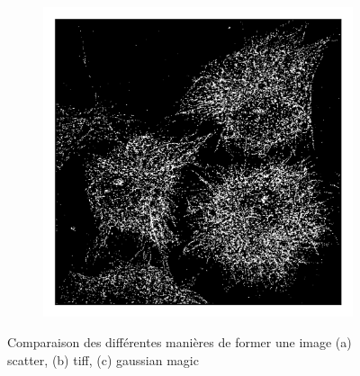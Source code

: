 \begin{figure}
\begin{subfigure}{0.32\textwidth}
        \caption{}
    \end{subfigure}
    \begin{subfigure}{0.32\textwidth}
        \includegraphics[width=\textwidth]{figures/gaussian_test.png}
        \caption{}
    \end{subfigure}
    \caption{Comparaison des différentes manières de former une image
    (a) scatter, (b) tiff, (c) gaussian magic}
\end{figure}